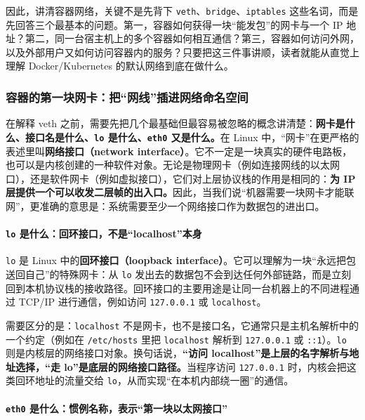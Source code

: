因此，讲清容器网络，关键不是先背下 \texttt{veth}、\texttt{bridge}、\texttt{iptables} 这些名词，而是先回答三个最基本的问题。第一，容器如何获得一块“能发包”的网卡与一个 IP 地址？第二，同一台宿主机上的多个容器如何相互通信？第三，容器如何访问外网，以及外部用户又如何访问容器内的服务？只要把这三件事讲顺，读者就能从直觉上理解 Docker/Kubernetes 的默认网络到底在做什么。

\subsubsection{容器的第一块网卡：把“网线”插进网络命名空间}

在解释 veth 之前，需要先把几个最基础但最容易被忽略的概念讲清楚：\textbf{网卡是什么、接口名是什么、\texttt{lo} 是什么、\texttt{eth0} 又是什么。}在 Linux 中，“网卡”在更严格的表述里叫\textbf{网络接口（network interface）}。它不一定是一块真实的硬件电路板，也可以是内核创建的一种软件对象。无论是物理网卡（例如连接网线的以太网口），还是软件网卡（例如虚拟接口），它们对上层协议栈的作用是相同的：\textbf{为 IP 层提供一个可以收发二层帧的出入口。}因此，当我们说“机器需要一块网卡才能联网”，更准确的意思是：系统需要至少一个网络接口作为数据包的进出口。

\paragraph{\texttt{lo} 是什么：回环接口，不是“localhost”本身}

\texttt{lo} 是 Linux 中的\textbf{回环接口（loopback interface）}。它可以理解为一块“永远把包送回自己”的特殊网卡：从 \texttt{lo} 发出去的数据包不会到达任何外部链路，而是立刻回到本机协议栈的接收路径。回环接口的主要用途是让同一台机器上的不同进程通过 TCP/IP 进行通信，例如访问 \texttt{127.0.0.1} 或 \texttt{localhost}。

需要区分的是：\texttt{localhost} 不是网卡，也不是接口名，它通常只是主机名解析中的一个约定（例如在 \texttt{/etc/hosts} 里把 \texttt{localhost} 解析到 \texttt{127.0.0.1} 或 \texttt{::1}）。\texttt{lo} 则是内核层的网络接口对象。换句话说，\textbf{“访问 localhost”是上层的名字解析与地址选择，“走 lo”是底层的网络接口路径。}当程序访问 \texttt{127.0.0.1} 时，内核会把这类回环地址的流量交给 \texttt{lo}，从而实现“在本机内部绕一圈”的通信。

\paragraph{\texttt{eth0} 是什么：惯例名称，表示“第一块以太网接口”}

